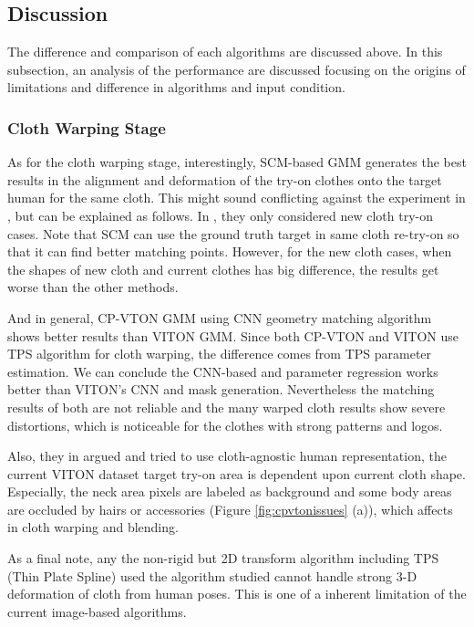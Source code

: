  
\subsection{Discussion}

The difference and comparison of each algorithms are discussed above. In this subsection, an analysis of the performance are discussed focusing on the origins of limitations and difference in algorithms and input condition.  

\subsubsection{Cloth Warping Stage}

As for the cloth warping stage, interestingly, SCM-based GMM generates the best results in the alignment and deformation of the try-on clothes onto the target human for the same cloth. This might sound conflicting against the experiment in \cite{Wang2018TowardCI}, but can be explained as follows. In \cite{Wang2018TowardCI}, they only considered new cloth try-on cases.  Note that SCM can use the ground truth target in same cloth re-try-on so that it can find better matching points. However, for the new cloth cases, when the shapes of new cloth and current clothes has big difference, the results get worse than the other methods.
  
And in general, CP-VTON GMM using CNN geometry matching algorithm shows better results than VITON GMM. Since both CP-VTON and VITON use TPS algorithm for cloth warping, the difference comes from TPS parameter estimation. We can conclude the CNN-based and parameter regression works better than VITON's CNN and mask generation. Nevertheless the matching results of both are not reliable and the many warped cloth results show severe distortions, which is noticeable for the clothes with strong patterns and logos. 


Also, they in \cite{Han2017VITONAI} argued and tried to use cloth-agnostic human representation, the current VITON dataset target try-on area is dependent upon current cloth shape. Especially, the neck area pixels are labeled as background and some body areas are occluded by hairs or accessories (Figure \ref{fig:cpvtonissues} (a)), which affects in cloth warping and blending. 


As a final note, any the non-rigid but 2D transform algorithm including TPS (Thin Plate Spline)\cite{Bookstein1989PrincipalWT} used the algorithm studied cannot handle strong 3-D deformation of cloth from human poses. This is one of a inherent limitation of the current image-based algorithms.


